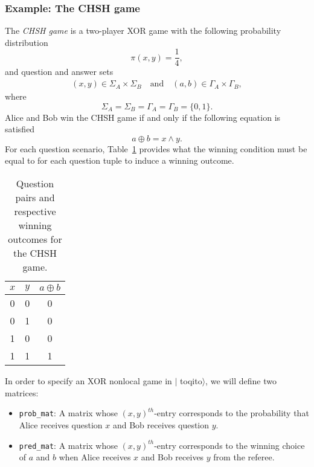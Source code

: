 \documentclass[nofootinbib,superscriptaddress,a4paper,twocolumn,longbibliography,floatfix,pra]{revtex4-2}
\newcommand{\toqitofont}{%
	\fontfamily{FiraSans}%
	\selectfont}
\newcommand{\toqito}{ $|${\toqitofont toqito}$\rangle$\xspace}
\begin{document}
\subsubsection{Example: The CHSH game}
\label{sec:chsh_game}

The \emph{CHSH game} is a two-player XOR game with the following probability
distribution 
\begin{equation}
    \pi(x,y) = \frac{1}{4},
\end{equation}
and question and answer sets
\begin{equation}
    \begin{aligned}
        (x,y) \in \Sigma_A \times \Sigma_B \quad \text{and} \quad (a,b) \in
        \Gamma_A \times \Gamma_B,
    \end{aligned}
\end{equation}
where 
\begin{equation}
    \Sigma_A = \Sigma_B = \Gamma_A = \Gamma_B = \{0,1\}.
\end{equation}
Alice and Bob win the CHSH game if and only if the following equation is
satisfied
\begin{equation}
    a \oplus b = x \land y.
\end{equation}
For each question scenario, Table~\ref{tab:chsh_winning} provides what the
winning condition must be equal to for each question tuple to induce a winning
outcome.
\begin{table}[!htpb]\label{tab:chsh_winning}
    \begin{tabular}{|c|c|c|}
        \hline
        \textbf{$x$} & \textbf{$y$} & \textbf{$a \oplus b$} \\ \hline
        0 & 0 & 0 \\ \hline
        0 & 1 & 0 \\ \hline
        1 & 0 & 0 \\ \hline
        1 & 1 & 1 \\ \hline
    \end{tabular}
    \caption{Question pairs and respective winning outcomes for the CHSH game.}
\end{table}
In order to specify an XOR nonlocal game in \toqito, we will define two
matrices:

\begin{itemize}[noitemsep]
    \item \texttt{prob\_mat}: A matrix whose $(x,y)^{th}$-entry corresponds to
        the probability that Alice receives question $x$ and Bob receives
        question $y$. \\
    \item \texttt{pred\_mat}: A matrix whose $(x,y)^{th}$-entry corresponds to
        the winning choice of $a$ and $b$ when Alice receives $x$ and Bob
        receives $y$ from the referee.
\end{itemize}
\end{document}
